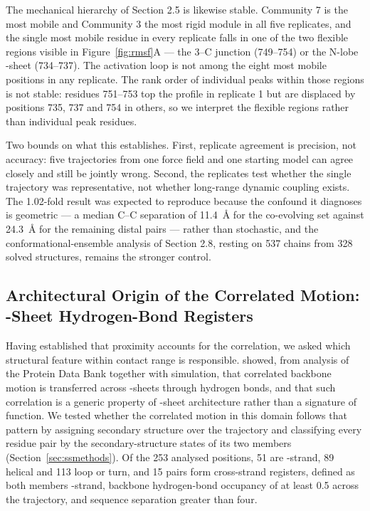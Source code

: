 \documentclass[utf8]{FrontiersinHarvard}
\begin{document}
The mechanical hierarchy of Section 2.5 is likewise stable. Community 7 is the most mobile and Community 3 the most rigid module in all five replicates, and the single most mobile residue in every replicate falls in one of the two flexible regions visible in Figure~\ref{fig:rmsf}A --- the \textbeta{}3--\textalpha{}C junction (749--754) or the N-lobe \textbeta{}-sheet (734--737). The activation loop is not among the eight most mobile positions in any replicate. The rank order of individual peaks within those regions is not stable: residues 751--753 top the profile in replicate 1 but are displaced by positions 735, 737 and 754 in others, so we interpret the flexible regions rather than individual peak residues.

Two bounds on what this establishes. First, replicate agreement is precision, not accuracy: five trajectories from one force field and one starting model can agree closely and still be jointly wrong. Second, the replicates test whether the single trajectory was representative, not whether long-range dynamic coupling exists. The 1.02-fold result was expected to reproduce because the confound it diagnoses is geometric --- a median C\textalpha{}--C\textalpha{} separation of 11.4~\AA{} for the co-evolving set against 24.3~\AA{} for the remaining distal pairs --- rather than stochastic, and the conformational-ensemble analysis of Section 2.8, resting on 537 chains from 328 solved structures, remains the stronger control.

\subsection{Architectural Origin of the Correlated Motion: \textbeta{}-Sheet Hydrogen-Bond Registers}
\label{sec:betasheet}

Having established that proximity accounts for the correlation, we asked which structural feature within contact range is responsible. \citet{Fenwick2014} showed, from analysis of the Protein Data Bank together with simulation, that correlated backbone motion is transferred across \textbeta{}-sheets through hydrogen bonds, and that such correlation is a generic property of \textbeta{}-sheet architecture rather than a signature of function. We tested whether the correlated motion in this domain follows that pattern by assigning secondary structure over the trajectory and classifying every residue pair by the secondary-structure states of its two members (Section~\ref{sec:ssmethods}). Of the 253 analysed positions, 51 are \textbeta{}-strand, 89 helical and 113 loop or turn, and 15 pairs form cross-strand \textbeta{} registers, defined as both members \textbeta{}-strand, backbone hydrogen-bond occupancy of at least 0.5 across the trajectory, and sequence separation greater than four.
\end{document}
